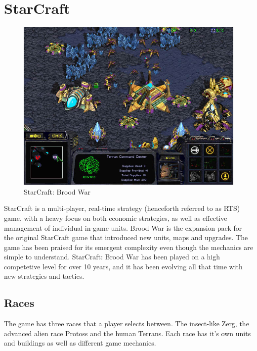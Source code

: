 
\section{StarCraft}
\label{sec:starcrafttheory}


\begin{figure}[h!tb]
\centering
\includegraphics[scale=0.5]{graphics/scbw.jpg}
\caption{StarCraft: Brood War}
\label{fig:scbwIntro}
\end{figure}

StarCraft is a multi-player, real-time strategy (henceforth referred to as RTS) game, with a heavy focus on both economic strategies, as well as effective management of individual in-game units. Brood War is the expansion pack for the original StarCraft game that introduced new units, maps and upgrades. The game has been praised for its emergent complexity even though the mechanics are simple to understand. StarCraft: Brood War has been played on a high competetive level for over 10 years, and it has been evolving all that time with new strategies and tactics.

\subsection{Races}
The game has three races that a player selects between. The insect-like Zerg, the advanced alien race Protoss and the human
Terrans. Each race has it's own units and buildings as well as different game mechanics. 

